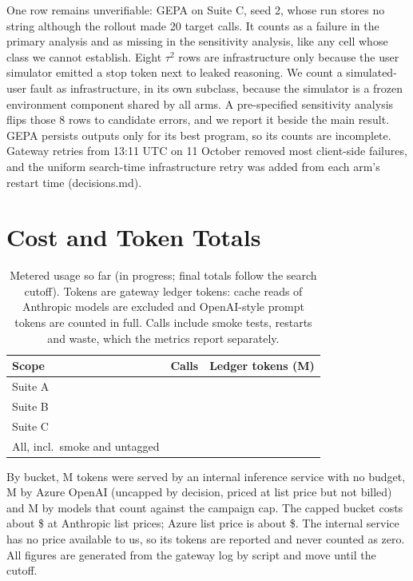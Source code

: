 One row remains unverifiable: GEPA on Suite C, seed 2, whose run stores no string although the rollout made 20 target calls.
It counts as a failure in the primary analysis and as missing in the sensitivity analysis, like any cell whose class we cannot establish.
Eight $\tau^2$ rows are infrastructure only because the user simulator emitted a stop token next to leaked reasoning.
We count a simulated-user fault as infrastructure, in its own subclass, because the simulator is a frozen environment component shared by all arms.
A pre-specified sensitivity analysis flips those 8 rows to candidate errors, and we report it beside the main result.
GEPA persists outputs only for its best program, so its counts are incomplete.
Gateway retries from 13:11 UTC on 11 October removed most client-side failures, and the uniform search-time infrastructure retry was added from each arm's restart time (decisions.md).



\section{Cost and Token Totals}
\label{app:cost}

\begin{table}[h]
\caption{Metered usage so far (in progress; final totals follow the search cutoff). Tokens are gateway ledger tokens: cache reads of Anthropic models are excluded and OpenAI-style prompt tokens are counted in full. Calls include smoke tests, restarts and waste, which the metrics report separately.}
\label{tab:cost}
\centering\small
\begin{tabular}{@{}lrr@{}}
\toprule
Scope & Calls & Ledger tokens (M) \\
\midrule
Suite A & \costACalls{} & \costATokensM{} \\
Suite B & \costBCalls{} & \costBTokensM{} \\
Suite C & \costCCalls{} & \costCTokensM{} \\
All, incl.\ smoke and untagged & \costCalls{} & \costLedgerM{} \\
\bottomrule
\end{tabular}
\end{table}

By bucket, \costRitsM{}M tokens were served by an internal inference service with no budget, \costAzureM{}M by Azure OpenAI (uncapped by decision, priced at list price but not billed) and \costCappedM{}M by models that count against the campaign cap. The capped bucket costs about \$\costUsdCapped{} at Anthropic list prices; Azure list price is about \$\costUsdAzure{}. The internal service has no price available to us, so its tokens are reported and never counted as zero. All figures are generated from the gateway log by script and move until the cutoff. 

